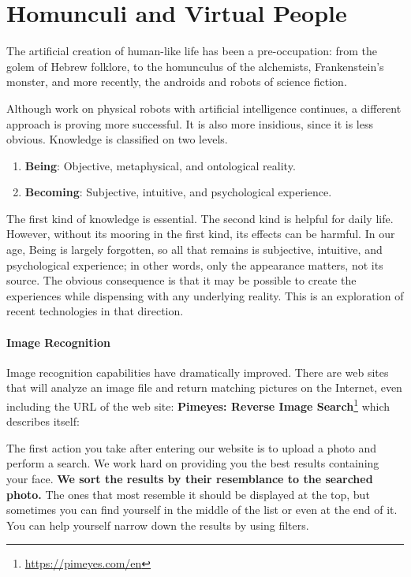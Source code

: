 \section{Homunculi and Virtual People}

The artificial creation of human-like life has been a pre-occupation: from the golem of Hebrew folklore, to the homunculus of the alchemists, Frankenstein's monster, and more recently, the androids and robots of science fiction.

Although work on physical robots with artificial intelligence continues, a different approach is proving more successful. It is also more insidious, since it is less obvious. Knowledge is classified on two levels.

\begin{enumerate}
\item \textbf{Being}: Objective, metaphysical, and ontological reality.
\item \textbf{Becoming}: Subjective, intuitive, and psychological experience.
\end{enumerate}

The first kind of knowledge is essential. The second kind is helpful for daily life. However, without its mooring in the first kind, its effects can be harmful. In our age, Being is largely forgotten, so all that remains is subjective, intuitive, and psychological experience; in other words, only the appearance matters, not its source. The obvious consequence is that it may be possible to create the experiences while dispensing with any underlying reality. This is an exploration of recent technologies in that direction.

\paragraph{Image Recognition}


Image recognition capabilities have dramatically improved. There are web sites that will analyze an image file and return matching pictures on the Internet, even including the URL of the web site: \textbf{Pimeyes: Reverse Image Search}\footnote{\url{https://pimeyes.com/en}} which describes itself:

\begin{quotex}
The first action you take after entering our website is to upload a photo and perform a search. We work hard on providing you the best results containing your face. \textbf{We sort the results by their resemblance to the searched photo.} The ones that most resemble it should be displayed at the top, but sometimes you can find yourself in the middle of the list or even at the end of it. You can help yourself narrow down the results by using filters.
\end{quotex}


